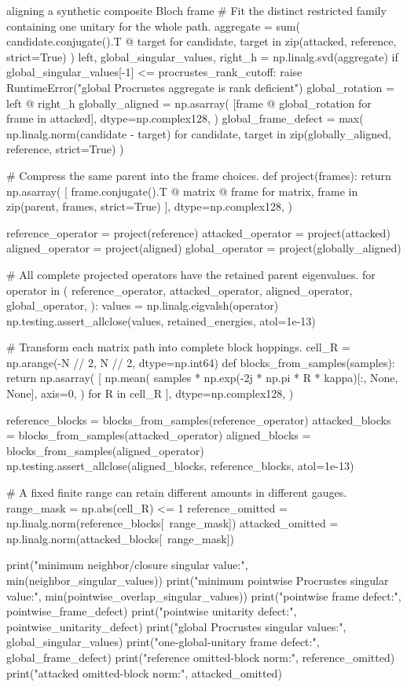 \begin{pythonexample}{aligning a synthetic composite Bloch frame}
# Fit the distinct restricted family containing one unitary for the whole path.
aggregate = sum(
    candidate.conjugate().T @ target
    for candidate, target in zip(attacked, reference, strict=True)
)
left, global_singular_values, right_h = np.linalg.svd(aggregate)
if global_singular_values[-1] <= procrustes_rank_cutoff:
    raise RuntimeError("global Procrustes aggregate is rank deficient")
global_rotation = left @ right_h
globally_aligned = np.asarray(
    [frame @ global_rotation for frame in attacked],
    dtype=np.complex128,
)
global_frame_defect = max(
    np.linalg.norm(candidate - target)
    for candidate, target in zip(globally_aligned, reference, strict=True)
)

# Compress the same parent into the frame choices.
def project(frames):
    return np.asarray(
        [
            frame.conjugate().T @ matrix @ frame
            for matrix, frame in zip(parent, frames, strict=True)
        ],
        dtype=np.complex128,
    )

reference_operator = project(reference)
attacked_operator = project(attacked)
aligned_operator = project(aligned)
global_operator = project(globally_aligned)

# All complete projected operators have the retained parent eigenvalues.
for operator in (
    reference_operator,
    attacked_operator,
    aligned_operator,
    global_operator,
):
    values = np.linalg.eigvalsh(operator)
    np.testing.assert_allclose(values, retained_energies, atol=1e-13)

# Transform each matrix path into complete block hoppings.
cell_R = np.arange(-N // 2, N // 2, dtype=np.int64)
def blocks_from_samples(samples):
    return np.asarray(
        [
            np.mean(
                samples
                * np.exp(-2j * np.pi * R * kappa)[:, None, None],
                axis=0,
            )
            for R in cell_R
        ],
        dtype=np.complex128,
    )

reference_blocks = blocks_from_samples(reference_operator)
attacked_blocks = blocks_from_samples(attacked_operator)
aligned_blocks = blocks_from_samples(aligned_operator)
np.testing.assert_allclose(aligned_blocks, reference_blocks, atol=1e-13)

# A fixed finite range can retain different amounts in different gauges.
range_mask = np.abs(cell_R) <= 1
reference_omitted = np.linalg.norm(reference_blocks[~range_mask])
attacked_omitted = np.linalg.norm(attacked_blocks[~range_mask])

print("minimum neighbor/closure singular value:", min(neighbor_singular_values))
print("minimum pointwise Procrustes singular value:",
      min(pointwise_overlap_singular_values))
print("pointwise frame defect:", pointwise_frame_defect)
print("pointwise unitarity defect:", pointwise_unitarity_defect)
print("global Procrustes singular values:", global_singular_values)
print("one-global-unitary frame defect:", global_frame_defect)
print("reference omitted-block norm:", reference_omitted)
print("attacked omitted-block norm:", attacked_omitted)
\end{pythonexample}

